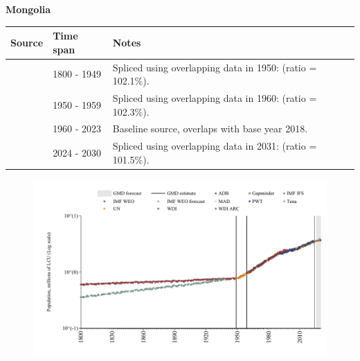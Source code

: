 \documentclass[12pt,a4paper,landscape]{article}
\begin{document}
\begin{adjustbox}{max totalsize={\paperwidth}{\paperheight},center}
\begin{minipage}[t][\textheight][t]{\textwidth}
\vspace*{0.5cm}
{}
\begin{center}
{\Large\bfseries Mongolia}
\end{center}
\vspace{0.5cm}
\begin{table}[H]
\centering
\small
\begin{tabular}{|l|l|l|}
\hline
\textbf{Source} & \textbf{Time span} & \textbf{Notes} \\
\hline
\rowcolor{white}\cite{Gapminder}& 1800 - 1949 &Spliced using overlapping data in 1950: (ratio = 102.1\%).\\
\rowcolor{lightgray}\cite{IMF_IFS}& 1950 - 1959 &Spliced using overlapping data in 1960: (ratio = 102.3\%).\\
\rowcolor{white}\cite{WDI}& 1960 - 2023 &Baseline source, overlaps with base year 2018.\\
\rowcolor{lightgray}\cite{Gapminder}& 2024 - 2030 &Spliced using overlapping data in 2031: (ratio = 101.5\%).\\
\hline
\end{tabular}
\end{table}
\begin{figure}[H]
\centering
\includegraphics[width=\textwidth,height=0.6\textheight,keepaspectratio]{graphs/MNG_pop.pdf}
\end{figure}
\end{minipage}
\end{adjustbox}
\end{document}
